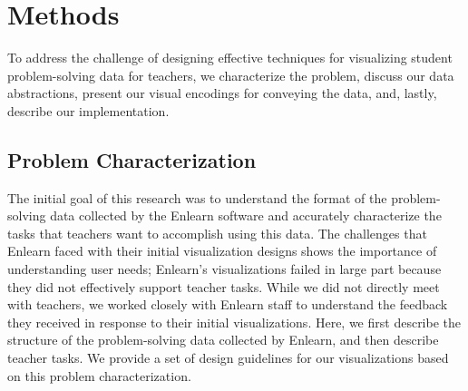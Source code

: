 \documentclass{sigchi}
\begin{document}



\section{Methods}
To address the challenge of designing effective techniques for visualizing student problem-solving data for teachers, we characterize the problem, discuss our data abstractions, present our visual encodings for conveying the data, and, lastly, describe our implementation.


\subsection{Problem Characterization}
The initial goal of this research was to understand the format of the problem-solving data collected by the Enlearn software and accurately characterize the tasks that teachers want to accomplish using this data. The challenges that Enlearn faced with their initial visualization designs shows the importance of understanding user needs; Enlearn's visualizations failed in large part because they did not effectively support teacher tasks. While we did not directly meet with teachers, we worked closely with Enlearn staff to understand the feedback they received in response to their initial visualizations. Here, we first describe the structure of the problem-solving data collected by Enlearn, and then describe teacher tasks. We provide a set of design guidelines for our visualizations based on this problem characterization.
\end{document}
